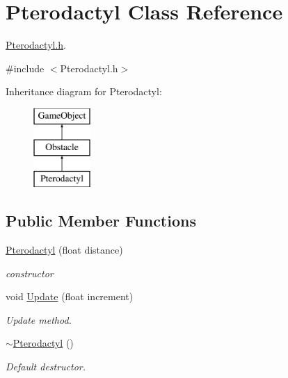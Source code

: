 \hypertarget{class_pterodactyl}{}\section{Pterodactyl Class Reference}
\label{class_pterodactyl}


\mbox{\hyperlink{_pterodactyl_8h_source}{Pterodactyl.\+h}}.  




{\ttfamily \#include $<$Pterodactyl.\+h$>$}

Inheritance diagram for Pterodactyl\+:\begin{figure}[H]
\begin{center}
\leavevmode
\includegraphics[height=3.000000cm]{class_pterodactyl}
\end{center}
\end{figure}
\subsection*{Public Member Functions}
\begin{DoxyCompactItemize}
\item 
\mbox{\hyperlink{class_pterodactyl_a4a43eda1d2298cfbce3f2f4a1b223e2a}{Pterodactyl}} (float distance)
\begin{DoxyCompactList}\small\item\em constructor \end{DoxyCompactList}\item 
\mbox{\label{class_pterodactyl_aab44efaf2bae744c9210d88969ed7dc7}} 
void \mbox{\hyperlink{class_pterodactyl_aab44efaf2bae744c9210d88969ed7dc7}{Update}} (float increment)
\begin{DoxyCompactList}\small\item\em Update method. \end{DoxyCompactList}\item 
\mbox{\label{class_pterodactyl_a57c101dcc34661693bb424770d590c0a}} 
\mbox{\hyperlink{class_pterodactyl_a57c101dcc34661693bb424770d590c0a}{$\sim$\+Pterodactyl}} ()
\begin{DoxyCompactList}\small\item\em Default destructor. \end{DoxyCompactList}\end{DoxyCompactItemize}
